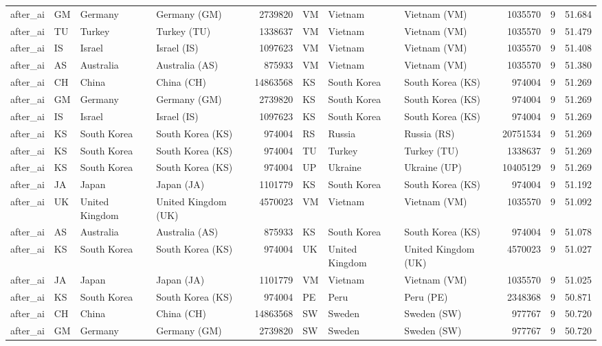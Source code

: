 \begin{tabular}{llllrlllrrr}
after\_ai & GM & Germany & Germany (GM) & 2739820 & VM & Vietnam & Vietnam (VM) & 1035570 & 9 & 51.684 \\
after\_ai & TU & Turkey & Turkey (TU) & 1338637 & VM & Vietnam & Vietnam (VM) & 1035570 & 9 & 51.479 \\
after\_ai & IS & Israel & Israel (IS) & 1097623 & VM & Vietnam & Vietnam (VM) & 1035570 & 9 & 51.408 \\
after\_ai & AS & Australia & Australia (AS) & 875933 & VM & Vietnam & Vietnam (VM) & 1035570 & 9 & 51.380 \\
after\_ai & CH & China & China (CH) & 14863568 & KS & South Korea & South Korea (KS) & 974004 & 9 & 51.269 \\
after\_ai & GM & Germany & Germany (GM) & 2739820 & KS & South Korea & South Korea (KS) & 974004 & 9 & 51.269 \\
after\_ai & IS & Israel & Israel (IS) & 1097623 & KS & South Korea & South Korea (KS) & 974004 & 9 & 51.269 \\
after\_ai & KS & South Korea & South Korea (KS) & 974004 & RS & Russia & Russia (RS) & 20751534 & 9 & 51.269 \\
after\_ai & KS & South Korea & South Korea (KS) & 974004 & TU & Turkey & Turkey (TU) & 1338637 & 9 & 51.269 \\
after\_ai & KS & South Korea & South Korea (KS) & 974004 & UP & Ukraine & Ukraine (UP) & 10405129 & 9 & 51.269 \\
after\_ai & JA & Japan & Japan (JA) & 1101779 & KS & South Korea & South Korea (KS) & 974004 & 9 & 51.192 \\
after\_ai & UK & United Kingdom & United Kingdom (UK) & 4570023 & VM & Vietnam & Vietnam (VM) & 1035570 & 9 & 51.092 \\
after\_ai & AS & Australia & Australia (AS) & 875933 & KS & South Korea & South Korea (KS) & 974004 & 9 & 51.078 \\
after\_ai & KS & South Korea & South Korea (KS) & 974004 & UK & United Kingdom & United Kingdom (UK) & 4570023 & 9 & 51.027 \\
after\_ai & JA & Japan & Japan (JA) & 1101779 & VM & Vietnam & Vietnam (VM) & 1035570 & 9 & 51.025 \\
after\_ai & KS & South Korea & South Korea (KS) & 974004 & PE & Peru & Peru (PE) & 2348368 & 9 & 50.871 \\
after\_ai & CH & China & China (CH) & 14863568 & SW & Sweden & Sweden (SW) & 977767 & 9 & 50.720 \\
after\_ai & GM & Germany & Germany (GM) & 2739820 & SW & Sweden & Sweden (SW) & 977767 & 9 & 50.720 \\

\end{tabular}
